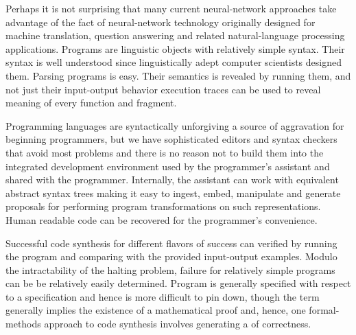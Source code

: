 
Perhaps it is not surprising that many current neural-network approaches take advantage of the fact of neural-network technology originally designed for machine translation, question answering and related natural-language processing applications. Programs are linguistic objects with relatively simple syntax. Their syntax is well understood since linguistically adept computer scientists designed them. Parsing programs is easy. Their semantics is revealed by running them, and not just their input-output behavior \emdash{} execution traces can be used to reveal meaning of every function and fragment. 

Programming languages are syntactically unforgiving \emdash{} a source of aggravation for beginning programmers, but we have sophisticated editors and syntax checkers that avoid most problems and there is no reason not to build them into the integrated development environment used by the programmer's assistant and shared with the programmer. Internally, the assistant can work with equivalent abstract syntax trees making it easy to ingest, embed, manipulate and generate proposals for performing program transformations on such representations. Human readable code can be recovered for the programmer's convenience.

Successful code synthesis \emdash{} for different flavors of success \emdash{} can verified by running the program and comparing with the provided input-output examples. Modulo the intractability of the halting problem, failure for relatively simple programs can be be relatively easily determined. Program {} is generally specified with respect to a specification and hence is more difficult to pin down, though the term generally implies the existence of a mathematical proof and, hence, one formal-methods approach to code synthesis involves generating a {} of correctness. 

